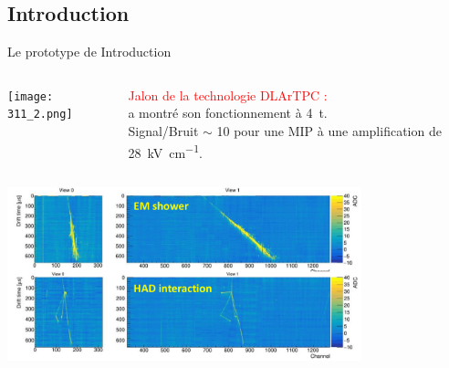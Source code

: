        \subsection{Introduction}

    \begin{frame}{Le prototype de \TOO{}}{Introduction}
		\begin{columns}
			\begin{column}{0.48\textwidth}
				\centering
				\texttt{[image: 311\_2.png]}
			\end{column}\hfill
			\begin{column}{0.48\textwidth}
				\begin{scriptsize}
					\textcolor{red}{Jalon de la technologie DLArTPC :} \\ a montré son fonctionnement à \SI{4}{\tonne}.\\
					Signal/Bruit $\sim$ 10 pour une MIP à une amplification de \SI{28}{\kilo\volt\per\centi\meter}.
				\end{scriptsize}
			\end{column}\hfill
		\end{columns}
		\centering
		\includegraphics[width=0.77\textwidth]{./pictures/events.png}\\
	\end{frame}
	    
